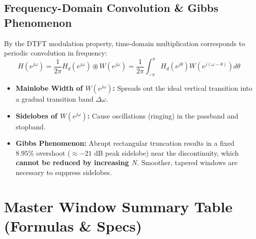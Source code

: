 \documentclass[11pt,a4paper]{article}
\begin{document}
\subsection{Frequency-Domain Convolution \& Gibbs Phenomenon}
By the DTFT modulation property, time-domain multiplication corresponds to periodic convolution in frequency:
\begin{equation}
H(e^{j\omega}) = \frac{1}{2\pi} H_d(e^{j\omega}) \circledast W(e^{j\omega}) = \frac{1}{2\pi} \int_{-\pi}^{\pi} H_d(e^{j\theta}) W(e^{j(\omega - \theta)}) d\theta
\end{equation}
\begin{itemize}
    \item \textbf{Mainlobe Width of $W(e^{j\omega})$:} Spreads out the ideal vertical transition into a gradual transition band $\Delta\omega$.
    \item \textbf{Sidelobes of $W(e^{j\omega})$:} Cause oscillations (ringing) in the passband and stopband.
    \item \textbf{Gibbs Phenomenon:} Abrupt rectangular truncation results in a fixed $8.95\%$ overshoot ($\approx -21$ dB peak sidelobe) near the discontinuity, which \textbf{cannot be reduced by increasing $N$}. Smoother, tapered windows are necessary to suppress sidelobes.
\end{itemize}

\newpage

\section{Master Window Summary Table (Formulas \& Specs)}

\begin{table}[H]
\centering
\caption{Characteristics of Standard FIR Filter Window Functions}
\label{tab:windows}
\vspace{2mm}
\end{table}
\end{document}
